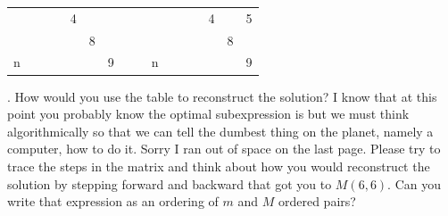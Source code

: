 \documentclass[12pt]{article}
\begin{document}
\begin{table}[]
\begin{tabular}{llllllllllllllll}
    \multicolumn{1}{l|}{}  & \multicolumn{1}{l|}{}  & \multicolumn{1}{l|}{}  & \multicolumn{1}{l|}{}    & \multicolumn{1}{l|}{4} & \multicolumn{1}{l|}{}  & \multicolumn{1}{l|}{}  &  &  & \multicolumn{1}{l|}{}  & \multicolumn{1}{l|}{}  & \multicolumn{1}{l|}{}  & \multicolumn{1}{l|}{}  & \multicolumn{1}{l|}{4} & \multicolumn{1}{l|}{}  & \multicolumn{1}{l|}{5} \\ \cline{2-7} \cline{11-16} 
    \multicolumn{1}{l|}{}  & \multicolumn{1}{l|}{}  & \multicolumn{1}{l|}{}  & \multicolumn{1}{l|}{}    & \multicolumn{1}{l|}{}  & \multicolumn{1}{l|}{8} & \multicolumn{1}{l|}{}  &  &  & \multicolumn{1}{l|}{}  & \multicolumn{1}{l|}{}  & \multicolumn{1}{l|}{}  & \multicolumn{1}{l|}{}  & \multicolumn{1}{l|}{}  & \multicolumn{1}{l|}{8} & \multicolumn{1}{l|}{}  \\ \cline{2-7} \cline{11-16} 
    \multicolumn{1}{l|}{n} & \multicolumn{1}{l|}{}  & \multicolumn{1}{l|}{}  & \multicolumn{1}{l|}{}    & \multicolumn{1}{l|}{}  & \multicolumn{1}{l|}{}  & \multicolumn{1}{l|}{9} &  &  & \multicolumn{1}{l|}{n} & \multicolumn{1}{l|}{}  & \multicolumn{1}{l|}{}  & \multicolumn{1}{l|}{}  & \multicolumn{1}{l|}{}  & \multicolumn{1}{l|}{}  & \multicolumn{1}{l|}{9} \\ \cline{2-7} \cline{11-16} 
    \end{tabular}
    \end{table}
    \FloatBarrier
\newpage
{}. How would you use the table to reconstruct the solution? I know that at this
point you probably know the optimal subexpression is but we must think algorithmically
so that we can tell the dumbest thing on the planet, namely a computer, how to
do it. Sorry I ran out of space on the last page. Please try to trace the steps in the matrix
and think about how you would reconstruct the solution by stepping forward and backward that got you
to $M(6,6)$. Can you write that expression as an ordering of $m$ and $M$ ordered pairs?\\\\
\end{document}
